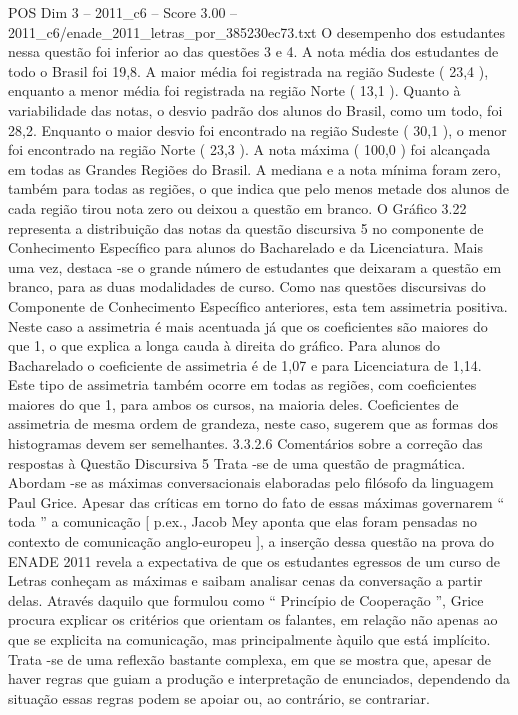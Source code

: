 \begin{textsample}{POS Dim 3 – 2011\_c6 – Score 3.00 – 2011\_c6/enade\_2011\_letras\_por\_385230ec73.txt}
O desempenho dos estudantes nessa questão foi inferior ao das questões 3 e 4.
A nota média dos estudantes de todo o Brasil foi 19,8.
A maior média foi registrada na região Sudeste ( 23,4 ), enquanto a menor média foi registrada na região Norte ( 13,1 ).
Quanto à variabilidade das notas, o desvio padrão dos alunos do Brasil, como um todo, foi 28,2.
Enquanto o maior desvio foi encontrado na região Sudeste ( 30,1 ), o menor foi encontrado na região Norte ( 23,3 ).
A nota máxima ( 100,0 ) foi alcançada em todas as Grandes Regiões do Brasil.
A mediana e a nota mínima foram zero, também para todas as regiões, o que indica que pelo menos metade dos alunos de cada região tirou nota zero ou deixou a questão em branco.
O Gráfico 3.22 representa a distribuição das notas da questão discursiva 5 no componente de Conhecimento Específico para alunos do Bacharelado e da Licenciatura.
Mais uma vez, destaca -se o grande número de estudantes que deixaram a questão em branco, para as duas modalidades de curso.
Como nas questões discursivas do Componente de Conhecimento Específico anteriores, esta tem assimetria positiva.
Neste caso a assimetria é mais acentuada já que os coeficientes são maiores do que 1, o que explica a longa cauda à direita do gráfico.
Para alunos do Bacharelado o coeficiente de assimetria é de 1,07 e para Licenciatura de 1,14.
Este tipo de assimetria também ocorre em todas as regiões, com coeficientes maiores do que 1, para ambos os cursos, na maioria deles.
Coeficientes de assimetria de mesma ordem de grandeza, neste caso, sugerem que as formas dos histogramas devem ser semelhantes. 3.3.2.6 Comentários sobre a correção das respostas à Questão Discursiva 5 Trata -se de uma questão de pragmática.
Abordam -se as máximas conversacionais elaboradas pelo filósofo da linguagem Paul Grice.
Apesar das críticas em torno do fato de essas máximas governarem “ toda ” a comunicação [ p.ex., Jacob Mey aponta que elas foram pensadas no contexto de comunicação anglo-europeu ], a inserção dessa questão na prova do ENADE 2011 revela a expectativa de que os estudantes egressos de um curso de Letras conheçam as máximas e saibam analisar cenas da conversação a partir delas.
Através daquilo que formulou como “ Princípio de Cooperação ”, Grice procura explicar os critérios que orientam os falantes, em relação não apenas ao que se explicita na comunicação, mas principalmente àquilo que está implícito.
Trata -se de uma reflexão bastante complexa, em que se mostra que, apesar de haver regras que guiam a produção e interpretação de enunciados, dependendo da situação essas regras podem se apoiar ou, ao contrário, se contrariar.

\end{textsample}
